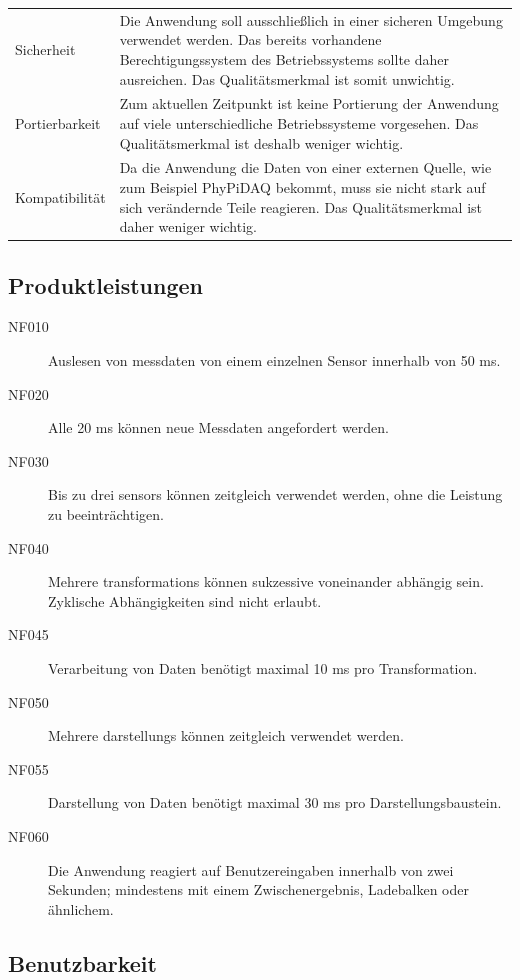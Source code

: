 \documentclass[parskip=full]{scrartcl}
\begin{document}
\begin{tabular}{| p{3cm} | p{10cm} |}
	Sicherheit & Die Anwendung soll ausschließlich in einer sicheren Umgebung verwendet werden. Das bereits vorhandene Berechtigungssystem des Betriebssystems sollte daher ausreichen. Das Qualitätsmerkmal ist somit unwichtig.\\\cline{1-2}
	
	Portierbarkeit & Zum aktuellen Zeitpunkt ist keine Portierung der Anwendung auf viele unterschiedliche Betriebssysteme vorgesehen. Das Qualitätsmerkmal ist deshalb weniger wichtig.\\\cline{1-2}
	
	Kompatibilität & Da die Anwendung die Daten von einer externen Quelle, wie zum Beispiel \gls{PhyPiDAQ} bekommt, muss sie nicht stark auf sich verändernde Teile reagieren. Das Qualitätsmerkmal ist daher weniger wichtig.\\\cline{1-2}
	\hline
\end{tabular}

\subsection{Produktleistungen}

\begin{description}

\item[NF010] Auslesen von \gls{messdaten} von einem einzelnen Sensor innerhalb von 50 ms.
\item[NF020] Alle 20 ms können neue Messdaten angefordert werden.
\item[NF030] Bis zu drei \glspl{sensor} können zeitgleich verwendet werden, ohne die Leistung zu beeinträchtigen.
\item[NF040] Mehrere \glspl{transformation} können sukzessive voneinander abhängig sein. Zyklische Abhängigkeiten sind nicht erlaubt.
\item[NF045] Verarbeitung von Daten benötigt maximal 10 ms pro Transformation.
\item[NF050] Mehrere \glspl{darstellung} können zeitgleich verwendet werden.
\item[NF055] Darstellung von Daten benötigt maximal 30 ms pro Darstellungsbaustein.
\item[NF060] Die Anwendung reagiert auf Benutzereingaben innerhalb von zwei Sekunden; mindestens mit einem Zwischenergebnis, Ladebalken oder ähnlichem.

\end{description}

\subsection{Benutzbarkeit}
\end{document}
